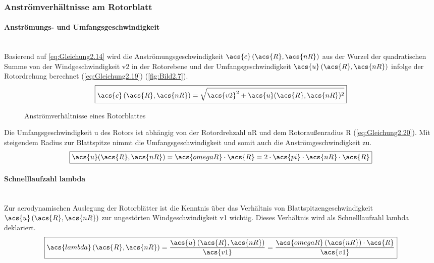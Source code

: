 \subsubsection{Anströmverhältnisse am Rotorblatt}

\paragraph{Anströmungs- und Umfangsgeschwindigkeit}\mbox{}\smallskip\\
Basierend auf \autoref{eq:Gleichung2.14} wird die Anströmungsgeschwindigkeit $\acs{c}\left(\acs{R}, \acs{nR}\right)$ aus der Wurzel der quadratischen Summe von der Windgeschwindigkeit \acs{v2} in der Rotorebene und der Umfangsgeschwindigkeit $\acs{u}\left(\acs{R}, \acs{nR}\right)$ infolge der Rotordrehung berechnet (\autoref{eq:Gleichung2.19}) (\autoref{fig:Bild2.7}).
\begin{equation} \label{eq:Gleichung2.19}
    \boxed{\acs{c}\left(\acs{R}, \acs{nR}\right) = \sqrt{\acs{v2}^2 + \acs{u}(\acs{R}, \acs{nR})^2}}
\end{equation}
\begin{figure}[H]
   \centering
   \caption[Antrömverhältnisse eines Rotorblattes]{Anströmverhältnisse eines Rotorblattes \cite{SkriptSchulte}}
   \label{fig:Bild2.7}
\end{figure}

Die Umfangsgeschwindigkeit \acs{u} des Rotors ist abhängig von der Rotordrehzahl \acs{nR} und dem Rotoraußenradius \acs{R} (\autoref{eq:Gleichung2.20}). Mit steigendem Radius zur Blattspitze nimmt die Umfangsgeschwindigkeit und somit auch die Anströmgeschwindigkeit zu.
\begin{equation} \label{eq:Gleichung2.20}
    \boxed{\acs{u}(\acs{R}, \acs{nR}) = \acs{omegaR} \cdot \acs{R} = 2 \cdot \acs{pi} \cdot \acs{nR} \cdot \acs{R}}
\end{equation}

\paragraph{Schnelllaufzahl \acs{lambda}}\mbox{}\smallskip\\
Zur aerodynamischen Auslegung der Rotorblätter ist die Kenntnis über das Verhältnis von Blattspitzengeschwindigkeit $\acs{u}\left(\acs{R}, \acs{nR}\right)$ zur ungestörten Windgeschwindigkeit \acs{v1} wichtig. Dieses Verhältnis wird als Schnelllaufzahl \acs{lambda} deklariert.
\begin{equation} \label{eq:Gleichung2.21}
    \boxed{\acs{lambda}\left(\acs{R}, \acs{nR}\right) = \frac{\acs{u}\left(\acs{R}, \acs{nR}\right)}{\acs{v1}} = \frac{\acs{omegaR}\left(\acs{nR}\right) \cdot \acs{R}}{\acs{v1}}}
\end{equation}

